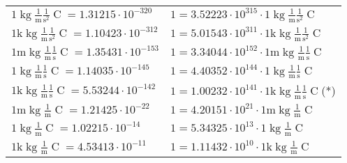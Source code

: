 \begin{center}
\begin{longtable}{l l}
{\color{black}$1 \bm{\mathrm{ }}\operatorname{kg}\frac1{\operatorname{m}}\frac1{\operatorname{s}^2}{\operatorname{C}}{} = 1.31215\cdot10^{-320} $}   & {\color{black}$ 1 = 3.52223\cdot10^{315} \cdot 1 \bm{\mathrm{ }}\operatorname{kg}\frac1{\operatorname{m}}\frac1{\operatorname{s}^2}{\operatorname{C}}{}$}  \\
{\color{gray}$1 \bm{\mathrm{ k}}\operatorname{kg}\frac1{\operatorname{m}}\frac1{\operatorname{s}^2}{\operatorname{C}}{} = 1.10423\cdot10^{-312} $}   & {\color{gray}$ 1 = 5.01543\cdot10^{311} \cdot 1 \bm{\mathrm{ k}}\operatorname{kg}\frac1{\operatorname{m}}\frac1{\operatorname{s}^2}{\operatorname{C}}{}$}  \\
{\color{gray}$1 \bm{\mathrm{ m}}\operatorname{kg}\frac1{\operatorname{m}}\frac1{\operatorname{s}}{\operatorname{C}}{} = 1.35431\cdot10^{-153} $}   & {\color{gray}$ 1 = 3.34044\cdot10^{152} \cdot 1 \bm{\mathrm{ m}}\operatorname{kg}\frac1{\operatorname{m}}\frac1{\operatorname{s}}{\operatorname{C}}{}$}  \\
{\color{black}$1 \bm{\mathrm{ }}\operatorname{kg}\frac1{\operatorname{m}}\frac1{\operatorname{s}}{\operatorname{C}}{} = 1.14035\cdot10^{-145} $}   & {\color{black}$ 1 = 4.40352\cdot10^{144} \cdot 1 \bm{\mathrm{ }}\operatorname{kg}\frac1{\operatorname{m}}\frac1{\operatorname{s}}{\operatorname{C}}{}$}  \\
{\color{gray}$1 \bm{\mathrm{ k}}\operatorname{kg}\frac1{\operatorname{m}}\frac1{\operatorname{s}}{\operatorname{C}}{} = 5.53244\cdot10^{-142} $}   & {\color{gray}$ 1 = 1.00232\cdot10^{141} \cdot 1 \bm{\mathrm{ k}}\operatorname{kg}\frac1{\operatorname{m}}\frac1{\operatorname{s}}{\operatorname{C}}{}$}\quad(*)\\
{\color{gray}$1 \bm{\mathrm{ m}}\operatorname{kg}\frac1{\operatorname{m}}{}{\operatorname{C}}{} = 1.21425\cdot10^{-22} $}   & {\color{gray}$ 1 = 4.20151\cdot10^{21} \cdot 1 \bm{\mathrm{ m}}\operatorname{kg}\frac1{\operatorname{m}}{}{\operatorname{C}}{}$}  \\
{\color{black}$1 \bm{\mathrm{ }}\operatorname{kg}\frac1{\operatorname{m}}{}{\operatorname{C}}{} = 1.02215\cdot10^{-14} $}   & {\color{black}$ 1 = 5.34325\cdot10^{13} \cdot 1 \bm{\mathrm{ }}\operatorname{kg}\frac1{\operatorname{m}}{}{\operatorname{C}}{}$}  \\
{\color{gray}$1 \bm{\mathrm{ k}}\operatorname{kg}\frac1{\operatorname{m}}{}{\operatorname{C}}{} = 4.53413\cdot10^{-11} $}   & {\color{gray}$ 1 = 1.11432\cdot10^{10} \cdot 1 \bm{\mathrm{ k}}\operatorname{kg}\frac1{\operatorname{m}}{}{\operatorname{C}}{}$}  \\

\end{longtable}
\end{center}
